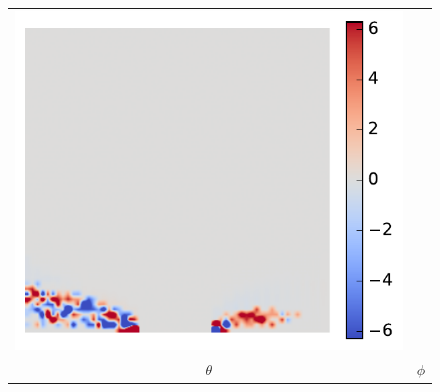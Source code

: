 \documentclass[11pt]{article}
\begin{document}
\begin{figure}[!h]
\begin{tabular}{cc}
         \includegraphics[scale=.5]{img/asymmetricFluxVol/phi.pdf}
         \\
         $\theta $ & $\phi$ 
    \end{tabular}
\end{figure}
\pagebreak
\end{document}
